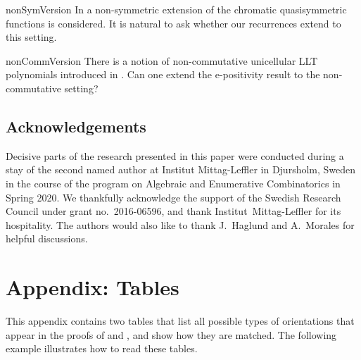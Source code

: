 \documentclass[reqno]{amsart}
\newcommand{\elementaryE}{\mathrm{e}}
\begin{document}
\begin{prob}{nonSymVersion}
In \cite{HaglundWilson2017,TewariWilsonZhang2019x} a non-symmetric extension
of the chromatic quasisymmetric functions is considered. 
It is natural to ask whether our recurrences extend to this setting.
\end{prob}

\begin{prob}{nonCommVersion}
There is a notion of non-commutative unicellular LLT polynomials introduced in \cite{NovelliThibon2019}.
Can one extend the $\elementaryE$-positivity result to the non-commutative setting?
\end{prob}



\subsection*{Acknowledgements}

Decisive parts of the research presented in this paper were conducted during a stay of the second named author at Institut
Mittag-Leffler in Djursholm, Sweden in the course of the program on Algebraic and Enumerative Combinatorics in Spring 2020.
We thankfully acknowledge the support of the Swedish Research
Council under grant no.~2016-06596, and thank Institut~Mittag-Leffler for its hospitality.
The authors would also like to thank J.~Haglund and A.~Morales for helpful discussions.




\section*{Appendix: Tables}
This appendix contains two tables that list all possible types of orientations that appear in the proofs of  and , and show how they are matched.
The following example illustrates how to read these tables.
\end{document}
